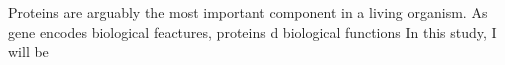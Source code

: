 Proteins are arguably the most important component in a living organism. As gene encodes biological feactures, proteins d biological functions   In this study, I will be 
